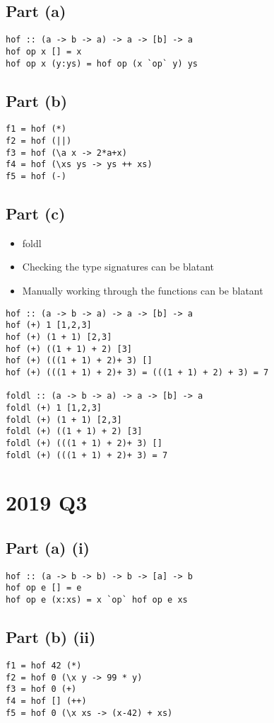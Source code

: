 \documentclass[11pt]{article}
\begin{document}
\subsection{Part (a)}
\label{sec:org3068e91}
\begin{verbatim}
hof :: (a -> b -> a) -> a -> [b] -> a
hof op x [] = x
hof op x (y:ys) = hof op (x `op` y) ys
\end{verbatim}
\subsection{Part (b)}
\label{sec:org5dd6bab}
\begin{verbatim}
f1 = hof (*)
f2 = hof (||)
f3 = hof (\a x -> 2*a+x)
f4 = hof (\xs ys -> ys ++ xs)
f5 = hof (-)
\end{verbatim}
\subsection{Part (c)}
\label{sec:orgd7125b3}
\begin{itemize}
\item foldl
\item Checking the type signatures can be blatant
\item Manually working through the functions can be blatant
\end{itemize}
\begin{verbatim}
hof :: (a -> b -> a) -> a -> [b] -> a
hof (+) 1 [1,2,3]
hof (+) (1 + 1) [2,3]
hof (+) ((1 + 1) + 2) [3]
hof (+) (((1 + 1) + 2)+ 3) []
hof (+) (((1 + 1) + 2)+ 3) = (((1 + 1) + 2) + 3) = 7

foldl :: (a -> b -> a) -> a -> [b] -> a
foldl (+) 1 [1,2,3]
foldl (+) (1 + 1) [2,3]
foldl (+) ((1 + 1) + 2) [3]
foldl (+) (((1 + 1) + 2)+ 3) []
foldl (+) (((1 + 1) + 2)+ 3) = 7
\end{verbatim}
\newpage
\section{2019 Q3}
\label{sec:org966ec55}
\subsection{Part (a) (i)}
\label{sec:orgad0aad7}
\begin{verbatim}
hof :: (a -> b -> b) -> b -> [a] -> b
hof op e [] = e
hof op e (x:xs) = x `op` hof op e xs
\end{verbatim}
\subsection{Part (b) (ii)}
\label{sec:orgf98eec4}
\begin{verbatim}
f1 = hof 42 (*)
f2 = hof 0 (\x y -> 99 * y)
f3 = hof 0 (+)
f4 = hof [] (++)
f5 = hof 0 (\x xs -> (x-42) + xs)
\end{verbatim}
\end{document}
